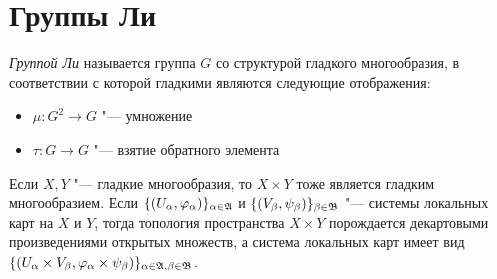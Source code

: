 \section{Группы Ли}

\begin{definition}
	\textit{Группой Ли} называется группа $G$ со структурой гладкого многообразия, в соответствии с которой гладкими являются следующие отображения:
	\begin{itemize}
		\item $\mu: G^2 \to G$ "--- умножение
		\item $\tau: G \to G$ "--- взятие обратного элемента
	\end{itemize}
\end{definition}

\begin{note}
	Если $X, Y$ "--- гладкие многообразия, то $X \times Y$ тоже является гладким многообразием. Если $\{(U_\alpha, \varphi_\alpha)\}_{\alpha \in \mathfrak A}$ и $\{(V_\beta, \psi_\beta)\}_{\beta \in \mathfrak B}$ "--- системы локальных карт на $X$ и $Y$, тогда топология пространства $X \times Y$ порождается декартовыми произведениями открытых множеств, а система локальных карт имеет вид $\{(U_\alpha \times V_\beta, \varphi_\alpha \times \psi_\beta)\}_{\alpha \in \mathfrak A, \beta \in \mathfrak B}$.
\end{note}

